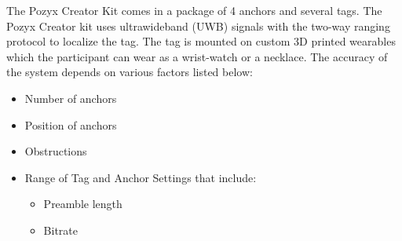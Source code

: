 The Pozyx Creator Kit comes in a package of 4 anchors and several tags. The Pozyx Creator
kit uses ultrawideband (UWB) signals with the two-way ranging protocol to localize the tag. 
The tag is mounted on custom 3D printed wearables which the participant can wear as 
a wrist-watch or a necklace. The accuracy of the system depends on various factors listed 
below:
\begin{itemize}
    \item Number of anchors
    \item Position of anchors
    \item Obstructions
    \item Range of Tag and Anchor Settings that include:
    \begin{itemize}
        \item Preamble length
        \item Bitrate
    \end{itemize}
\end{itemize}

